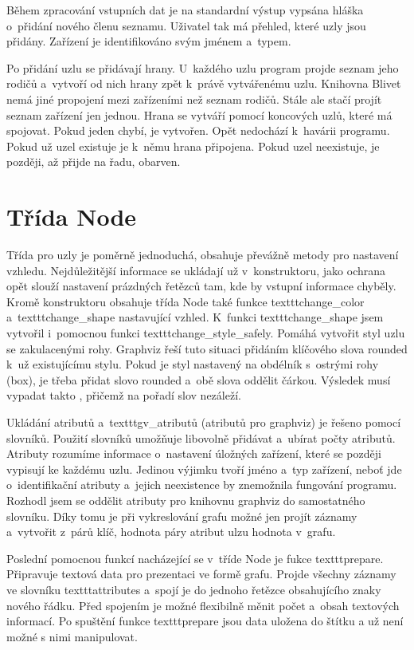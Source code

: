 \documentclass[color,table,oneside,nolot,nolof]{fithesis}
\begin{document}
	Během zpracování vstupních dat je na
	standardní výstup vypsána hláška o~přidání nového členu seznamu. Uživatel tak má přehled, které uzly jsou přidány. Zařízení je identifikováno svým jménem a~typem.

	Po přidání uzlu se přidávají hrany. U~každého uzlu program projde seznam jeho rodičů a~vytvoří od nich hrany zpět k~právě vytvářenému uzlu. 
	Knihovna Blivet nemá jiné propojení mezi zařízeními než seznam rodičů. Stále ale stačí projít seznam zařízení jen jednou. Hrana se vytváří pomocí koncových uzlů, které má spojovat.
	Pokud jeden chybí, je vytvořen. Opět nedochází k~havárii programu. Pokud už uzel existuje je k~němu hrana připojena. Pokud uzel neexistuje, je později, až přijde na řadu, obarven.

\section{Třída Node}
	Třída pro uzly je poměrně jednoduchá, obsahuje převážně metody pro nastavení vzhledu. Nejdůležitější informace se ukládají už v~konstruktoru, jako ochrana opět slouží nastavení
	prázdných řetězců tam, kde by vstupní informace chyběly. Kromě konstruktoru obsahuje třída Node také funkce texttt{change\_color} a~texttt{change\_shape} nastavující vzhled. K~funkci 
	texttt{change\_shape} 
	jsem vytvořil i~pomocnou funkci texttt{change\_style\_safely}. Pomáhá vytvořit styl uzlu se zakulacenými rohy. Graphviz řeší tuto situaci přidáním klíčového slova rounded k~už 
	existujícímu stylu. Pokud je styl nastavený na obdélník s~ostrými rohy (box), je třeba přidat slovo rounded a~obě slova oddělit čárkou. Výsledek musí vypadat takto ,
	přičemž na pořadí slov nezáleží.

	Ukládání atributů a~texttt{gv\_atributů} (atributů pro graphviz) je řešeno pomocí slovníků. Použití slovníků umožňuje libovolně přidávat a~ubírat počty atributů. 
	Atributy rozumíme informace o~nastavení úložných zařízení, které se později vypisují ke každému uzlu. Jedinou výjimku tvoří jméno a~typ zařízení, neboť jde
	o~identifikační atributy a~jejich neexistence by znemožnila fungování programu. Rozhodl jsem se oddělit atributy pro knihovnu graphviz do samostatného slovníku. Díky tomu je při
	vykreslování grafu možné jen projít záznamy a~vytvořit z~párů klíč, hodnota páry atribut ulzu hodnota v~grafu. 

	Poslední pomocnou funkcí nacházející se v~tříde Node je fukce texttt{prepare}. Připravuje textová data pro prezentaci ve formě grafu. Projde všechny záznamy ve slovníku texttt{attributes} a~spojí je do 
	jednoho řetězce obsahujícího znaky nového řádku. Před spojením je možné flexibilně měnit počet a~obsah textových informací. Po spuštění funkce texttt{prepare} jsou data uložena do štítku a už není možné
	s nimi manipulovat.
\end{document}
